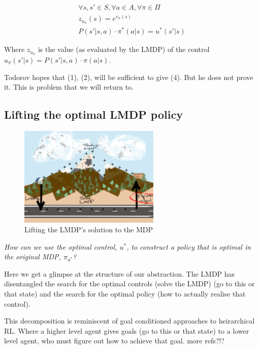 \begin{align*}
\forall s, s' \in S, \forall a \in A, \forall \pi \in \Pi \\
z_{u_{\pi}}(s) = e^{v_{\pi}(s)} \tag{3} \\
P(s'|s, a) \cdot \pi^{* }(a|s) = u^{* }(s'|s) \tag{4}
\end{align*}

Where $z_{u_{\pi}}$ is the value (as evaluated by the LMDP) of the control $u_{\pi}(s'|s) = P(s'|s, a) \cdot \pi(a|s)$.

Todorov hopes that (1), (2), will be sufficient to give (4). But he does not prove it.
This is problem that we will return to.


\subsection{Lifting the optimal LMDP policy}

\begin{figure}[h!]
\centering
\includegraphics[width=0.6\textwidth,height=0.3\textheight]{../../pictures/drawings/abstract-representations-project.png}
\caption{Lifting the LMDP's solution to the MDP}
\end{figure}

\begin{displayquote}
\textit{How can we use the optimal control, $u^{* }$, to construct a policy that is optimal in the original MDP, $\pi_{u^* }$?}
\end{displayquote}

Here we get a glimpse at the structure of our abstraction.
The LMDP has disentangled the search for the optimal controls (solve the LMDP) (go to this or
that state) and the search for the optimal policy (how to actually
realise that control).

This decomposition is reminiscent of goal conditioned approaches to heirarchical RL.
Where a higher level agent gives goals (go to this or that state) to a lower level
agent, who must figure out how to achieve that goal. \cite{Vezhnevets2017} {\color{red}more refs?!?}

